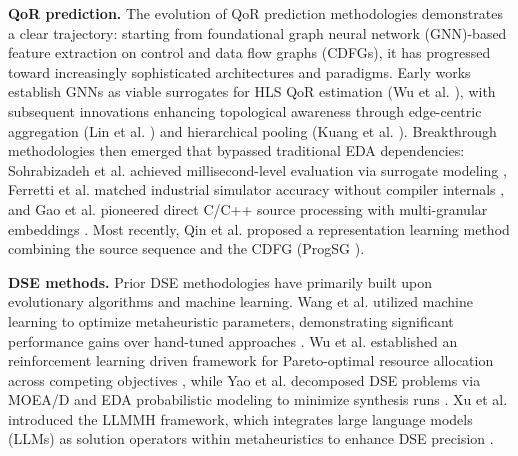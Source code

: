 \documentclass[conference]{IEEEtran}
\begin{document}
	{\bf{QoR prediction.}} The evolution of QoR prediction methodologies demonstrates a clear trajectory:  starting from foundational graph neural network (GNN)-based feature extraction on control and data flow graphs (CDFGs), it has progressed toward increasingly sophisticated architectures and paradigms. Early works establish GNNs as viable surrogates for HLS QoR estimation (Wu et al. \cite{Wu2021}), with subsequent innovations enhancing topological awareness through edge-centric aggregation (Lin et al. \cite{Lin2022}) and hierarchical pooling (Kuang et al. \cite{Kuang2023}). Breakthrough methodologies then emerged that bypassed traditional EDA dependencies: Sohrabizadeh et al. achieved millisecond-level evaluation via surrogate modeling \cite{Sohrabizadeh2022}, Ferretti et al. matched industrial simulator accuracy without compiler internals \cite{Ferretti2022}, and Gao et al. pioneered direct C/C++ source processing with multi-granular embeddings \cite{Gao2024}. Most recently, Qin et al. proposed a representation learning method combining the source sequence and the CDFG (ProgSG \cite{Qin2024}). %
	
	{\bf{DSE methods.}} Prior DSE methodologies  have primarily built upon evolutionary algorithms and machine learning. Wang et al. utilized machine learning to optimize metaheuristic parameters, demonstrating significant performance gains over hand-tuned approaches \cite{Wang2020}. Wu et al. established an reinforcement learning driven framework for Pareto-optimal resource allocation across competing objectives \cite{Wu2023}, while Yao et al. decomposed DSE problems via MOEA/D and EDA probabilistic modeling to minimize synthesis runs \cite{yao2025}. Xu et al. introduced the LLMMH framework, which integrates large language models (LLMs) as solution operators within metaheuristics to enhance DSE precision \cite{xu2025}. 

	
    
\end{document}
